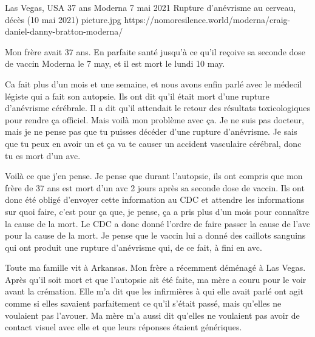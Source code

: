           {Las Vegas, USA}
          {37 ans}
          {Moderna}
          {7 mai 2021}
          {Rupture d'anévrisme au cerveau, décès (10 mai 2021)}
          {picture.jpg}
          {https://nomoresilence.world/moderna/craig-daniel-danny-bratton-moderna/}
          {

Mon frère avait 37 ans. En parfaite santé jusqu'à ce qu'il reçoive sa seconde
dose de vaccin Moderna le 7 may, et il est mort le lundi 10 may.

Ca fait plus d'un mois et une semaine, et nous avons enfin parlé avec le médecil
légiste qui a fait son autopsie. Ils ont dit qu'il était mort d'une rupture
d'anévrisme cérébrale. Il a dit qu'il attendait le retour des résultats
toxicologiques pour rendre ça officiel. Mais voilà mon problème avec ça. Je ne
suis pas docteur, mais je ne pense pas que tu puisses décéder d'une rupture
d'anévrisme. Je sais que tu peux en avoir un et ça va te causer un accident
vasculaire cérébral, donc tu es mort d'un avc.

Voilà ce que j'en pense. Je pense que durant l'autopsie, ils ont compris que mon
frère de 37 ans est mort d'un avc 2 jours après sa seconde dose de vaccin. Ils
ont donc été obligé d'envoyer cette information au CDC et attendre les
informations sur quoi faire, c'est pour ça que, je pense, ça a pris plus d'un
mois pour connaître la cause de la mort. Le CDC a donc donné l'ordre de faire
passer la cause de l'avc pour la cause de la mort. Je pense que le vaccin lui a
donné des caillots sanguins qui ont produit une rupture d'anévrisme qui, de ce
fait, à fini en avc.

Toute ma famille vit à Arkansas. Mon frère a récemment déménagé à Las
Vegas. Après qu'il soit mort et que l'autopsie ait été faite, ma mère a couru
pour le voir avant la crémation. Elle m'a dit que les infirmières à qui elle
avait parlé ont agit comme si elles savaient parfaitement ce qu'il s'était
passé, mais qu'elles ne voulaient pas l'avouer. Ma mère m'a aussi dit qu'elles
ne voulaient pas avoir de contact visuel avec elle et que leurs réponses étaient
génériques.

}

